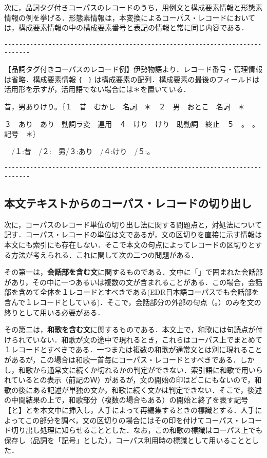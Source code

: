 次に，品詞タグ付きコーパスのレコードのうち，用例文と構成要素情報と形態素情報の例を挙げる．形態素情報は，本変換によるコーパス・レコードにおいては，構成要素情報の中の構成要素番号と表記の情報と常に同じ内容である．

\vspace{-8pt}\begin{verbatim}
-----------------------------------------------------------------------------
\end{verbatim}\vspace{-8pt}
\noindent
【品詞タグ付きコーパスのレコード例】伊勢物語より．レコード番号・管理情報は省略．構成要素情報 \verb+{　}+ は構成要素の配列．構成要素の最後のフィールドは活用形を示すが，活用語でない場合には＊を置いている．

昔，男ありけり。｛１　昔　むかし　名詞　＊　２　男　おとこ　名詞　＊　

３　あり　あり　動詞ラ変　連用　４　けり　けり　助動詞　終止　５　。　。　記号　＊｝

　/１:昔　/２:　男/３:あり　/４:けり　/５:。　　

\vspace{-8pt}\begin{verbatim}
-----------------------------------------------------------------------------
\end{verbatim}\vspace{-8pt}
\subsection{本文テキストからのコーパス・レコードの切り出し}
\label{sec:Sentence}

次に，コーパスのレコード単位の切り出し法に関する問題点と，対処法について記す．コーパス・レコードの単位は文であるが，文の区切りを直接に示す情報は本文にも索引にも存在しない．そこで本文の句点によってレコードの区切りとする方法が考えられる．これに関して次の二つの問題がある．

その第一は，{\bf 会話部を含む文}に関するものである．文中に「」で囲まれた会話部があり，その中に一つあるいは複数の文が含まれることがある．この場合，会話部を含めて全体を１レコードとすべきである(EDR日本語コーパスでも会話部を含んで１レコードとしている)．そこで，会話部分の外部の句点（。）のみを文の終りとして用いる必要がある．

その第二は，{\bf 和歌を含む文}に関するものである．本文上で，和歌には句読点が付けられていない．和歌が文の途中で現れるとき，これらはコーパス上でまとめて１レコードとすべきである．一つまたは複数の和歌が通常文とは別に現れることがあるが，この場合は和歌一首毎にコーパス・レコードとすべきである．しかし，和歌から通常文に続くか切れるかの判定ができない．索引語に和歌で用いられているとの表示（前記のＷ）があるが，文の開始の印はどこにもないので，和歌の後にある記述が単独の文か，和歌に続く文かは判定できない．そこで，後述の中間結果の上で，和歌部分（複数の場合もある）の開始と終了を表す記号【と】とを本文中に挿入し，人手によって再編集するときの標識とする．人手によってこの部分を調べ，文の区切りの場合にはその印を付けてコーパス・レコード切り出し処理に知らせることとした．なお，この和歌の標識はコーパス上でも保存し（品詞を「記号」とした），コーパス利用時の標識として用いることとした．

